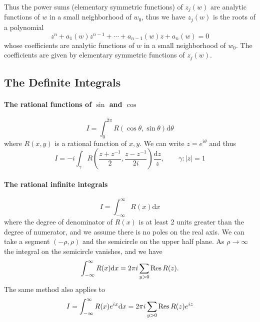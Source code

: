 \documentclass[../main.tex]{subfiles}
\begin{document}
Thus the power sums (elementary symmetric functions) of $z_j(w)$ are analytic functions of $w$ in a small neighborhood of $w_0$, thus we have $z_j(w)$ is the roots of a polynomial
\begin{equation}
	z^n + a_1(w) z^{n-1} + \cdots + a_{n-1}(w) z + a_n(w) = 0
\end{equation}
whose coefficients are analytic functions of $w$ in a small neighborhood of $w_0$. The coefficients are given by elementary symmetric functions of $z_j(w)$.

\subsection{The Definite Integrals}

\paragraph{The rational functions of $\sin $ and $\cos $}
\begin{equation}
	I = \int_0^{2 \pi} R(\cos \theta,\sin \theta) \mathrm{d} \theta
\end{equation}
where $R(x,y)$ is a rational function of $x,y$. We can write $z = e^{i \theta}$ and thus
\begin{equation*}
	I = -i \int_{\gamma} R\left(\frac{z+z^{-1}}{2},\frac{z-z^{-1}}{2i}\right) \frac{\mathrm{d} z}{z}, \qquad \gamma: \left|z\right|=1
\end{equation*}

\paragraph{The rational infinite integrals}
\begin{equation}
	I = \int_{-\infty}^{\infty} R(x) \mathrm{d} x
\end{equation}
where the degree of denominator of $R(x)$ is at least 2 units greater than the degree of numerator, and we assume there is no poles on the real axis. We can take a segment $(-\rho,\rho)$ and the semicircle on the upper half plane. As $\rho \rightarrow \infty $ the integral on the semicircle vanishes, and we have
\begin{equation}
	\int_{-\infty}^{\infty} R(x) \mathrm{d} x = 2 \pi i \sum_{y>0} \operatorname{Res} R(z). 
\end{equation}
The same method also applies to
\begin{equation}
	I = \int_{-\infty}^{\infty} R(x) e^{i x} \mathrm{d} x = 2 \pi i \sum_{y>0} \operatorname{Res} R(z) e^{i z}
\end{equation}
\end{document}
